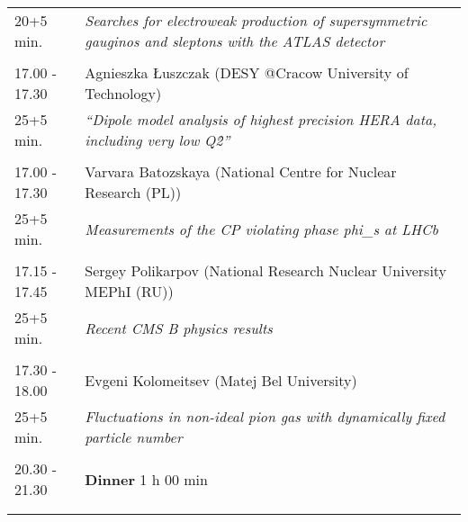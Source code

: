 \begin{longtable}{p{3cm}p{13cm}}
20+5 min. & {\it Searches for electroweak production of supersymmetric gauginos and sleptons with the ATLAS detector}\\ 
 & \\ 
17.00 - 17.30 & Agnieszka Łuszczak (DESY @Cracow University of Technology)\\ 
25+5 min. & {\it “Dipole model analysis of highest precision HERA data, including very low Q\^2”}\\ 
 & \\ 
17.00 - 17.30 & Varvara Batozskaya (National Centre for Nuclear Research (PL))\\ 
25+5 min. & {\it Measurements of the CP violating phase phi\_s at LHCb}\\ 
 & \\ 
17.15 - 17.45 & Sergey Polikarpov (National Research Nuclear  University MEPhI (RU))\\ 
25+5 min. & {\it Recent CMS B physics results}\\ 
 & \\ 
17.30 - 18.00 & Evgeni Kolomeitsev (Matej Bel University)\\ 
25+5 min. & {\it Fluctuations in non-ideal pion gas with dynamically fixed particle number}\\ 
 & \\ 
20.30 - 21.30 & {\bf Dinner} \hfill 1 h 00 min \\ 
 & \\ 
 & \\ 
\end{longtable}

